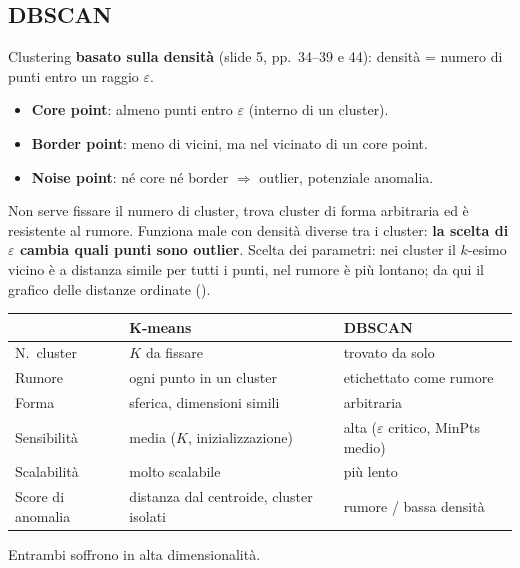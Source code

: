 \subsection{DBSCAN}
Clustering \textbf{basato sulla densità} (slide 5, pp.\ 34--39 e 44): densità = numero di punti entro un raggio $\varepsilon$.
\begin{itemize}
  \item \textbf{Core point}: almeno  punti entro $\varepsilon$ (interno di un cluster).
  \item \textbf{Border point}: meno di  vicini, ma nel vicinato di un core point.
  \item \textbf{Noise point}: né core né border $\Rightarrow$ outlier, potenziale anomalia.
\end{itemize}
Non serve fissare il numero di cluster, trova cluster di forma arbitraria ed è resistente al rumore. Funziona male con densità diverse
tra i cluster: \textbf{la scelta di $\varepsilon$ cambia quali punti sono outlier}. Scelta dei parametri: nei cluster il $k$-esimo vicino è a
distanza simile per tutti i punti, nel rumore è più lontano; da qui il grafico delle distanze ordinate ().

\begin{center}
\small
\begin{tabularx}{\linewidth}{@{}l X X@{}}
\toprule
 & \textbf{K-means} & \textbf{DBSCAN}\\
\midrule
N.\ cluster & $K$ da fissare & trovato da solo\\
Rumore & ogni punto in un cluster & etichettato come rumore\\
Forma & sferica, dimensioni simili & arbitraria\\
Sensibilità & media ($K$, inizializzazione) & alta ($\varepsilon$ critico, MinPts medio)\\
Scalabilità & molto scalabile & più lento\\
Score di anomalia & distanza dal centroide, cluster isolati & rumore / bassa densità\\
\bottomrule
\end{tabularx}
\end{center}
Entrambi soffrono in alta dimensionalità.

